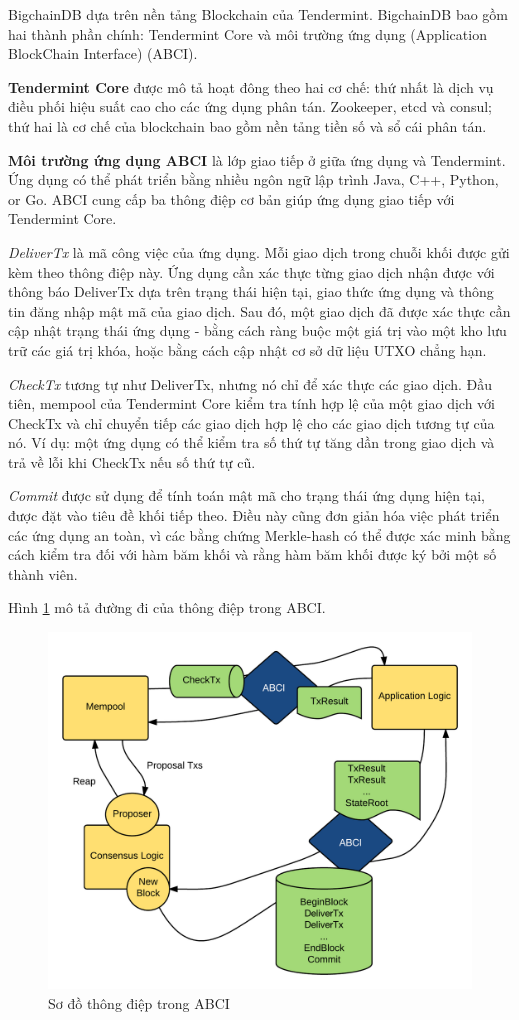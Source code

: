 BigchainDB dựa trên nền tảng Blockchain của Tendermint.
BigchainDB bao gồm hai thành phần chính: Tendermint Core và môi trường ứng dụng (Application BlockChain Interface) (ABCI).

\textbf{Tendermint Core} được mô tả hoạt đông theo hai cơ chế: thứ nhất là dịch vụ điều phối hiệu suất cao cho các ứng dụng phân tán. Zookeeper, etcd và consul; thứ hai là cơ chế của blockchain bao gồm nền tảng tiền số và sổ cái phân tán.

\textbf{Môi trường ứng dụng ABCI} là lớp giao tiếp ở giữa ứng dụng và Tendermint.
Ứng dụng có thể phát triển bằng nhiều ngôn ngữ lập trình Java, C++, Python, or Go. ABCI cung cấp ba thông điệp cơ bản giúp ứng dụng giao tiếp với Tendermint Core.

\emph{DeliverTx} là mã công việc của ứng dụng. Mỗi giao dịch trong chuỗi khối được gửi kèm theo thông điệp này. Ứng dụng cần xác thực từng giao dịch nhận được với thông báo DeliverTx dựa trên trạng thái hiện tại, giao thức ứng dụng và thông tin đăng nhập mật mã của giao dịch. Sau đó, một giao dịch đã được xác thực cần cập nhật trạng thái ứng dụng - bằng cách ràng buộc một giá trị vào một kho lưu trữ các giá trị khóa, hoặc bằng cách cập nhật cơ sở dữ liệu UTXO chẳng hạn.

\emph{CheckTx} tương tự như DeliverTx, nhưng nó chỉ để xác thực các giao dịch. Đầu tiên, mempool của Tendermint Core kiểm tra tính hợp lệ của một giao dịch với CheckTx và chỉ chuyển tiếp các giao dịch hợp lệ cho các giao dịch tương tự của nó. Ví dụ: một ứng dụng có thể kiểm tra số thứ tự tăng dần trong giao dịch và trả về lỗi khi CheckTx nếu số thứ tự cũ.

\emph{Commit} được sử dụng để tính toán mật mã cho trạng thái ứng dụng hiện tại, được đặt vào tiêu đề khối tiếp theo. Điều này cũng đơn giản hóa việc phát triển các ứng dụng an toàn, vì các bằng chứng Merkle-hash có thể được xác minh bằng cách kiểm tra đối với hàm băm khối và rằng hàm băm khối được ký bởi một số thành viên.

Hình \ref{fig:bc_abci} mô tả đường đi của thông điệp trong ABCI.

\begin{figure}[htbp]
\centering
\includegraphics[width=.9\linewidth]{img/bigchaindb.png}
\caption{Sơ đồ thông điệp trong ABCI}
\label{fig:bc_abci}
\end{figure}

